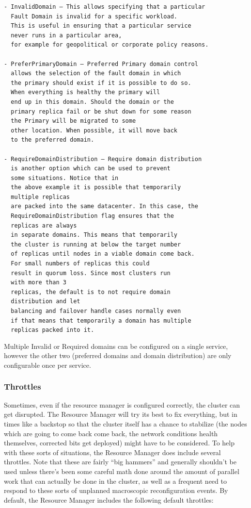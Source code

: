 \begin{verbatim}
- InvalidDomain – This allows specifying that a particular
  Fault Domain is invalid for a specific workload.
  This is useful in ensuring that a particular service
  never runs in a particular area,
  for example for geopolitical or corporate policy reasons.
 
- PreferPrimaryDomain – Preferred Primary domain control
  allows the selection of the fault domain in which
  the primary should exist if it is possible to do so. 
  When everything is healthy the primary will
  end up in this domain. Should the domain or the
  primary replica fail or be shut down for some reason
  the Primary will be migrated to some
  other location. When possible, it will move back
  to the preferred domain.

- RequireDomainDistribution – Require domain distribution
  is another option which can be used to prevent
  some situations. Notice that in
  the above example it is possible that temporarily
  multiple replicas
  are packed into the same datacenter. In this case, the
  RequireDomainDistribution flag ensures that the 
  replicas are always
  in separate domains. This means that temporarily
  the cluster is running at below the target number
  of replicas until nodes in a viable domain come back. 
  For small numbers of replicas this could
  result in quorum loss. Since most clusters run
  with more than 3
  replicas, the default is to not require domain
  distribution and let
  balancing and failover handle cases normally even
  if that means that temporarily a domain has multiple
  replicas packed into it.
\end{verbatim}

Multiple Invalid or Required domains can be configured on a single
service, however the other two (preferred domains and domain
distribution) are only configurable once per service.

\subsubsection{Throttles}
Sometimes, even if the resource manager is configured correctly, the
cluster can get disrupted. The Resource Manager will try its best to fix
everything, but in times like a backstop so that the cluster itself
has a chance to stabilize (the nodes which are going to come back come
back, the network conditions health themselves, corrected bits get
deployed) might have to be considered. To help with these sorts of
situations, the Resource Manager does include several throttles. Note
that these are fairly “big hammers” and generally shouldn’t be used
unless there’s been some careful math done around the amount of
parallel work that can actually be done in the cluster, as well as a
frequent need to respond to these sorts of unplanned macroscopic
reconfiguration events.  By default, the Resource Manager includes the
following default throttles:

